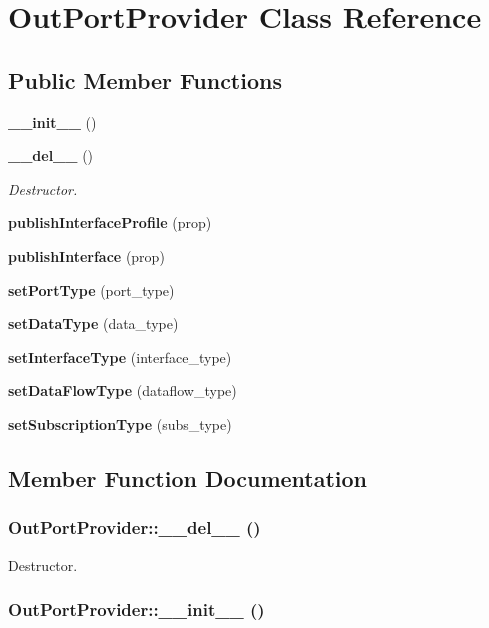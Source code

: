\section{Out\-Port\-Provider Class Reference}
\label{classOutPortProvider}
\subsection*{Public Member Functions}
\begin{CompactItemize}
\item 
{\bf \_\-\_\-init\_\-\_\-} ()
\item 
{\bf \_\-\_\-del\_\-\_\-} ()
\begin{CompactList}\small\item\em Destructor. \item\end{CompactList}\item 
{\bf publish\-Interface\-Profile} (prop)
\item 
{\bf publish\-Interface} (prop)
\item 
{\bf set\-Port\-Type} (port\_\-type)
\item 
{\bf set\-Data\-Type} (data\_\-type)
\item 
{\bf set\-Interface\-Type} (interface\_\-type)
\item 
{\bf set\-Data\-Flow\-Type} (dataflow\_\-type)
\item 
{\bf set\-Subscription\-Type} (subs\_\-type)
\end{CompactItemize}


\subsection{Member Function Documentation}
\subsubsection{\setlength{\rightskip}{0pt plus 5cm}Out\-Port\-Provider::\_\-\_\-del\_\-\_\- ()}\label{classOutPortProvider_OutPortProvidera1}


Destructor. 

\subsubsection{\setlength{\rightskip}{0pt plus 5cm}Out\-Port\-Provider::\_\-\_\-init\_\-\_\- ()}\label{classOutPortProvider_OutPortProvidera0}


